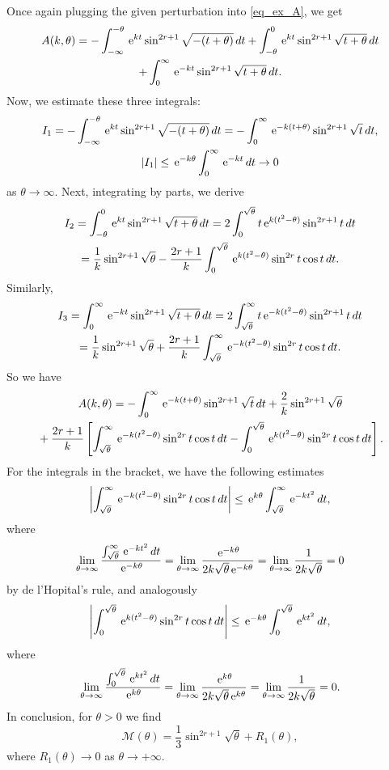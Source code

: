 \documentclass[10pt]{article}
\numberwithin{equation}{section}
\def\eu{ {\, \textrm{\rm e} }}
\def\aaa{\theta}
\theoremstyle{definition}
\theoremstyle{remark}
\begin{document}
Once again
plugging the given perturbation into \eqref{eq_ex_A}, we get
\begin{gather*}
	A(k, \aaa)=-\int_{-\infty}^{-\aaa}\eu^{kt}\sin^{2r+1}\sqrt{-(t+\aaa)}\,dt
	+\int_{-\aaa}^0\eu^{kt}\sin^{2r+1}\sqrt{t+\aaa}\,dt\\
	+\int_0^\infty \eu^{-kt}\sin^{2r+1}\sqrt{t+\aaa}\,dt.
\end{gather*}
Now, we estimate these three integrals:
\begin{gather*}
	I_1= -\int_{-\infty}^{-\aaa}\eu^{kt}\sin^{2r+1}\sqrt{-(t+\aaa)}\,dt
	= -\int_0^\infty\eu^{-k(t+\aaa)}\sin^{2r+1}\sqrt{t}\,dt, \\
	|I_1| \le  \eu^{-k\aaa}\int_0^\infty\eu^{-kt}\,dt \to 0
\end{gather*}
 as $\aaa\to\infty$.
Next, integrating by parts, we derive
\begin{gather*}
	I_2=\int_{-\aaa}^0\eu^{kt}\sin^{2r+1}\sqrt{t+\aaa}\,dt
	=2\int_0^{\sqrt{\aaa}}t\eu^{k(t^2-\aaa)}\sin^{2r+1}t\,dt\\
	=\frac{1}{k}\sin^{2r+1}\sqrt{\aaa}-\frac{2r+1}{k}\int_0^{\sqrt{\aaa}}\eu^{k(t^2-\aaa)}\sin^{2r}t\cos t\,dt	.
\end{gather*}
Similarly,
\begin{gather*}
	I_3=\int_0^\infty \eu^{-kt}\sin^{2r+1}\sqrt{t+\aaa}\,dt
	=2\int_{\sqrt{\aaa}}^\infty t\eu^{-k(t^2-\aaa)}\sin^{2r+1}t\,dt\\
	=\frac{1}{k}\sin^{2r+1}\sqrt{\aaa}+\frac{2r+1}{k}\int_{\sqrt{\aaa}}^\infty \eu^{-k(t^2-\aaa)}\sin^{2r}t\cos t\,dt.
\end{gather*}
So we have
 \begin{gather*}
	A(k,\theta)= -\int_0^\infty\eu^{-k(t+\aaa)}\sin^{2r+1}\sqrt{t}\,dt+\frac{2}{k}\sin^{2r+1}\sqrt{\aaa}\\
	{}+\frac{2r+1}{k}\left[\int_{\sqrt{\aaa}}^\infty \eu^{-k(t^2-\aaa)}\sin^{2r}t\cos t\,dt
	-\int_0^{\sqrt{\aaa}}\eu^{k(t^2-\aaa)}\sin^{2r}t\cos t\,dt\right].
\end{gather*}
For the integrals in the bracket, we have the following estimates
$$\left|\int_{\sqrt{\aaa}}^\infty \eu^{-k(t^2-\aaa)}\sin^{2r}t\cos t\,dt\right|
\leq \eu^{k\aaa}\int_{\sqrt{\aaa}}^\infty\eu^{-kt^2}\,dt,$$
where
$$\lim_{\aaa\to\infty}\frac{\int_{\sqrt{\aaa}}^\infty \eu^{-kt^2}\,dt}{\eu^{-k\aaa}}
=\lim_{\aaa\to\infty}\frac{\eu^{-k\aaa}}{2k\sqrt{\aaa}\eu^{-k\aaa}}=\lim_{\aaa\to\infty}\frac{1}{2k\sqrt{\aaa}}=0$$
by de l'Hopital's rule, and analogously
$$\left|\int_0^{\sqrt{\aaa}}\eu^{k(t^2-\aaa)}\sin^{2r}t\cos t\,dt\right|
\leq \eu^{-k\aaa}\int_0^{\sqrt{\aaa}}\eu^{kt^2}\,dt,$$
where
$$\lim_{\aaa\to\infty}\frac{\int_0^{\sqrt{\aaa}}\eu^{kt^2}\,dt}{\eu^{k\aaa}}
=\lim_{\aaa\to\infty}\frac{\eu^{k\aaa}}{2k\sqrt{\aaa}\eu^{k\aaa}}=\lim_{\aaa\to\infty}\frac{1}{2k\sqrt{\aaa}}=0.$$
In conclusion, for $\aaa>0$ we find
$$\mathcal{M}(\aaa)=\frac{1}{3}\sin^{2r+1}\sqrt{\aaa}+ R_1(\aaa),$$
where $R_1(\aaa)\to 0$ as $\aaa\to +\infty$.
\end{document}
